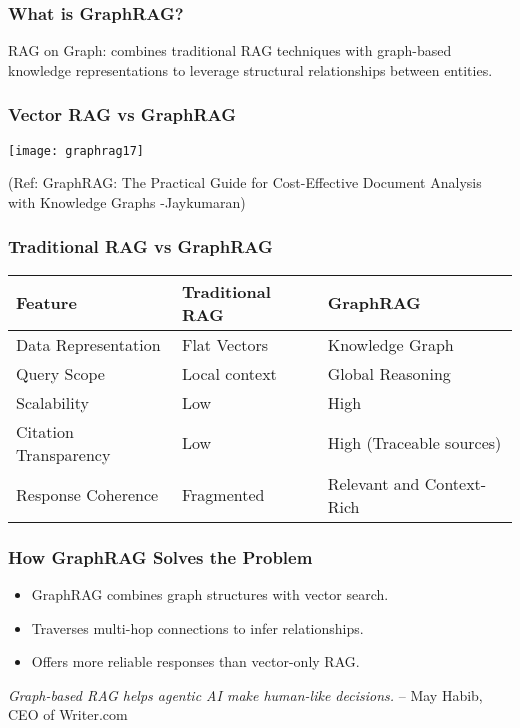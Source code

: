 \begin{frame}[fragile]\frametitle{What is GraphRAG?}

    \begin{block}
    RAG on Graph: combines traditional RAG techniques with graph-based knowledge representations to leverage structural relationships between entities.
    \end{block}
\end{frame}


\begin{frame}[fragile]\frametitle{Vector RAG vs GraphRAG}

	
	\begin{center}
	\texttt{[image: graphrag17]}
	
	{\tiny (Ref: GraphRAG: The Practical Guide for Cost-Effective Document Analysis with Knowledge Graphs -Jaykumaran)}
	\end{center}	
\end{frame}

\begin{frame}[fragile]\frametitle{Traditional RAG vs GraphRAG}
    \begin{table}[]
        \centering
        \begin{tabular}{|l|l|l|}
            \hline
            \textbf{Feature} & \textbf{Traditional RAG} & \textbf{GraphRAG} \\
            \hline
            Data Representation & Flat Vectors & Knowledge Graph \\
            \hline
            Query Scope & Local context & Global Reasoning \\
            \hline
            Scalability & Low & High \\
            \hline
            Citation Transparency & Low & High (Traceable sources) \\
            \hline
            Response Coherence & Fragmented & Relevant and Context-Rich \\
            \hline
        \end{tabular}
    \end{table}
\end{frame}

\begin{frame}[fragile]\frametitle{How GraphRAG Solves the Problem}
    \begin{itemize}
        \item GraphRAG combines graph structures with vector search.
        \item Traverses multi-hop connections to infer relationships.
        \item Offers more reliable responses than vector-only RAG.
    \end{itemize}

\textit{Graph-based RAG helps agentic AI make human-like decisions.} 
– May Habib, CEO of Writer.com
\end{frame}





